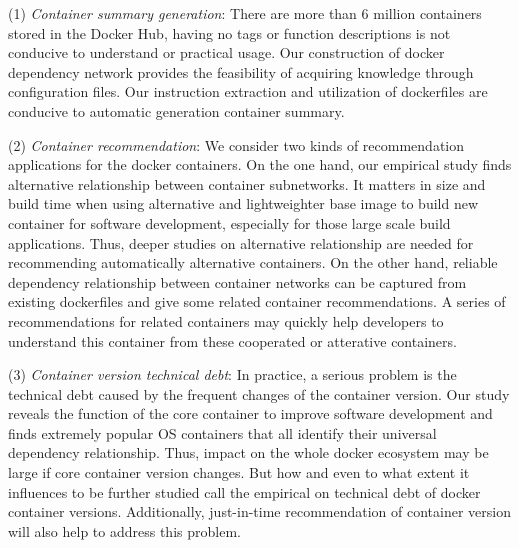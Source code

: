 \documentclass[sigconf]{acmart}
\begin{document}
(1) \noindent\emph{Container summary generation}: There are more than 6 million  containers stored in the Docker Hub, having no tags or function descriptions is not conducive to understand or practical usage. Our construction of docker dependency network provides the feasibility of acquiring knowledge through configuration files. %
Our instruction extraction and utilization of dockerfiles are conducive to automatic generation container summary. %

(2) \noindent\emph{Container recommendation}: We consider two kinds of recommendation applications for the docker containers. On the one hand, our empirical study finds alternative relationship between container subnetworks. It matters in size and build time when using alternative and lightweighter base image to build new container for software development,  especially for those large scale build applications. Thus, deeper studies on alternative relationship are needed for recommending automatically alternative containers. On the other hand, reliable dependency relationship between container networks can be captured from existing dockerfiles and give some related container recommendations. A series of recommendations for related containers may quickly help developers to understand this container from these cooperated or atterative containers.   



(3) \noindent\emph{Container version technical debt}: %
In practice, a serious problem is the technical debt caused by the frequent changes of the container version. Our study reveals the function of the core container to improve software development and finds extremely popular OS containers that all identify their universal dependency relationship. Thus, impact on the whole docker ecosystem may be large if core container version changes. But how and even to what extent it influences to be further studied call the empirical on technical debt of docker container versions. 
Additionally, just-in-time recommendation of container version will also help to address this problem. 

\end{document}

